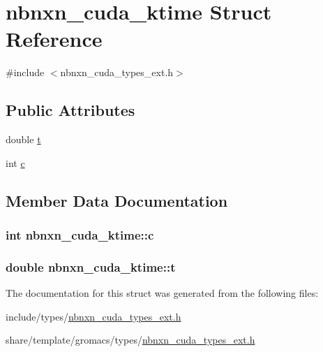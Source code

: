 \hypertarget{structnbnxn__cuda__ktime}{\section{nbnxn\-\_\-cuda\-\_\-ktime \-Struct \-Reference}
\label{structnbnxn__cuda__ktime}
}


{\ttfamily \#include $<$nbnxn\-\_\-cuda\-\_\-types\-\_\-ext.\-h$>$}

\subsection*{\-Public \-Attributes}
\begin{DoxyCompactItemize}
\item 
double \hyperlink{structnbnxn__cuda__ktime_a529058eed5a9ff067380480c3521320a}{t}
\item 
int \hyperlink{structnbnxn__cuda__ktime_a2ec6d7ac960ffbacd953370606fd8a19}{c}
\end{DoxyCompactItemize}


\subsection{\-Member \-Data \-Documentation}
\hypertarget{structnbnxn__cuda__ktime_a2ec6d7ac960ffbacd953370606fd8a19}{
\subsubsection[{c}]{\setlength{\rightskip}{0pt plus 5cm}int {\bf nbnxn\-\_\-cuda\-\_\-ktime\-::c}}}\label{structnbnxn__cuda__ktime_a2ec6d7ac960ffbacd953370606fd8a19}
\hypertarget{structnbnxn__cuda__ktime_a529058eed5a9ff067380480c3521320a}{
\subsubsection[{t}]{\setlength{\rightskip}{0pt plus 5cm}double {\bf nbnxn\-\_\-cuda\-\_\-ktime\-::t}}}\label{structnbnxn__cuda__ktime_a529058eed5a9ff067380480c3521320a}


\-The documentation for this struct was generated from the following files\-:\begin{DoxyCompactItemize}
\item 
include/types/\hyperlink{include_2types_2nbnxn__cuda__types__ext_8h}{nbnxn\-\_\-cuda\-\_\-types\-\_\-ext.\-h}\item 
share/template/gromacs/types/\hyperlink{share_2template_2gromacs_2types_2nbnxn__cuda__types__ext_8h}{nbnxn\-\_\-cuda\-\_\-types\-\_\-ext.\-h}\end{DoxyCompactItemize}
